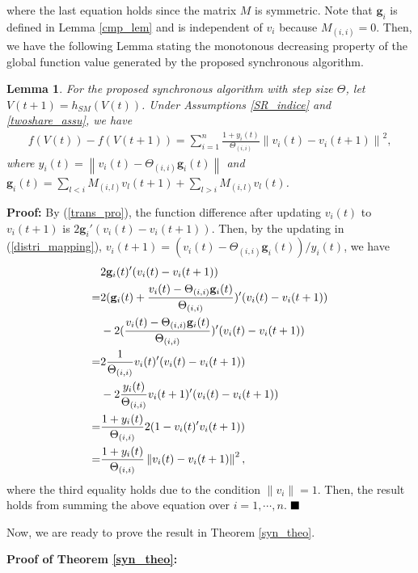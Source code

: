 \documentclass[journal]{IEEEtran}
\newtheorem{lemma}{Lemma}[section]
\begin{document}
where the last equation holds since the matrix $M$ is symmetric. Note that $ \mathbf{g}_i$ is defined in Lemma \ref{cmp_lem} and is independent of $v_i$ because $M_{(i,i)}=0$. Then, we have the following Lemma stating the monotonous decreasing property of the global function value generated by the proposed synchronous algorithm.
\begin{lemma}\label{f_decrease}
	For the proposed synchronous algorithm with step size $\Theta$, let ${V}(t+1)=h_{SM}(V(t))$. Under Assumptions \ref{SR_indice} and \ref{twoshare_assu}, we have
	\begin{align}\label{f_f}
	f(V(t))-f(V(t+1))=\sum_{i=1}^n \frac{1+y_i(t)}{\Theta_{(i,i)}} \left\|v_i(t)-v_i(t+1)\right\|^2,
	\end{align}
	where $y_i(t)=\left\|v_i(t)-\Theta_{(i,i)}\mathbf{g}_i(t)\right\|$ and  $\mathbf{g}_i(t)=\sum_{l<i} M_{(i,l)} v_l(t+1)+\sum_{l>i} M_{(i,l)} v_l(t)$.
\end{lemma}
\par\textbf{Proof:}
By (\ref{trans_pro}), the function difference after updating $v_i(t)$ to $v_i(t+1)$ is $2 \mathbf{g}_i'(v_i(t)-{v}_i(t+1))$. Then, by the updating in (\ref{distri_mapping}), ${v}_i(t+1)=(v_i(t)-\Theta_{(i,i)}\mathbf{g}_i(t))/ y_i(t)$, we have
\begin{align}\label{f_de}
&2 \mathbf{g}_i(t)'(v_i(t)-{v}_i(t+1))\notag\\
=& 2(\mathbf{g}_i(t)+\frac{v_i(t)-\Theta_{(i,i)}\mathbf{g}_i(t)}{\Theta_{(i,i)}})'(v_i(t)-{v}_i(t+1))\notag\\
&-2(\frac{v_i(t)-\Theta_{(i,i)}\mathbf{g}_i(t)}{\Theta_{(i,i)}})'(v_i(t)-{v}_i(t+1))\notag\\
=&2 \frac{1}{\Theta_{(i,i)}}v_i(t)'(v_i(t)-{v}_i(t+1))\notag\\
&-2\frac{y_i(t)}{\Theta_{(i,i)}}{v}_i(t+1)'(v_i(t)-{v}_i(t+1))\notag\\
=&\frac{1+y_i(t)}{\Theta_{(i,i)}} 2 (1-v_i(t)'{v}_i(t+1))\notag\\
=&\frac{1+y_i(t)}{\Theta_{(i,i)}} \left\|v_i(t)-{v}_i(t+1)\right\|^2,
\end{align}
where the third equality holds due to the condition $\|v_i\|=1$.
Then, the result holds from summing the above equation over $i=1,\cdots,n$.
$\hfill\blacksquare$
\par Now, we are ready to prove the result in Theorem \ref{syn_theo}.
\par \textbf{Proof of Theorem \ref{syn_theo}:}
\end{document}
